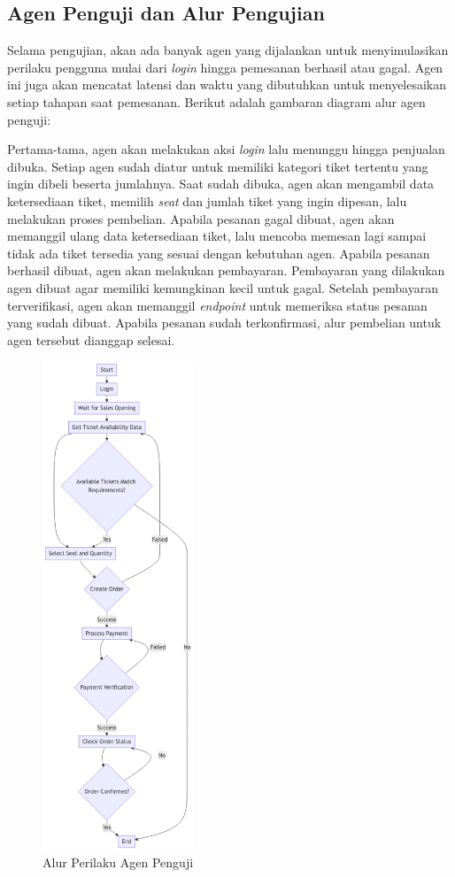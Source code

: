 \subsection{Agen Penguji dan Alur Pengujian}

Selama pengujian, akan ada banyak agen yang dijalankan untuk menyimulasikan perilaku pengguna mulai dari \textit{login} hingga pemesanan berhasil atau gagal. Agen ini juga akan mencatat latensi dan waktu yang dibutuhkan untuk menyelesaikan setiap tahapan saat pemesanan. Berikut adalah gambaran diagram alur agen penguji:

Pertama-tama, agen akan melakukan aksi \textit{login} lalu menunggu hingga penjualan dibuka. Setiap agen sudah diatur untuk memiliki kategori tiket tertentu yang ingin dibeli beserta jumlahnya. Saat sudah dibuka, agen akan mengambil data ketersediaan tiket, memilih \textit{seat} dan jumlah tiket yang ingin dipesan, lalu melakukan proses pembelian. Apabila pesanan gagal dibuat, agen akan memanggil ulang data ketersediaan tiket, lalu mencoba memesan lagi sampai tidak ada tiket tersedia yang sesuai dengan kebutuhan agen. Apabila pesanan berhasil dibuat, agen akan melakukan pembayaran. Pembayaran yang dilakukan agen dibuat agar memiliki kemungkinan kecil untuk gagal. Setelah pembayaran terverifikasi, agen akan memanggil \textit{endpoint} untuk memeriksa status pesanan yang sudah dibuat. Apabila pesanan sudah terkonfirmasi, alur pembelian untuk agen tersebut dianggap selesai.

\begin{figure}[htbp]
    \centering
    \includegraphics[width=0.4\textwidth]{resources/appendix/flow-agent.png}
    \caption{Alur Perilaku Agen Penguji}
    \label{fig:agent-flow}
\end{figure}